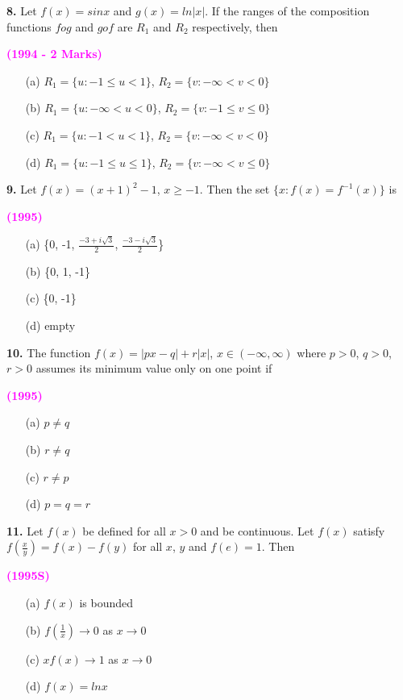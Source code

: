 \documentclass[journal,12pt,twocolumn]{IEEEtran}
\theoremstyle{remark}
\begin{document}
\textbf{8.} Let $f(x)=sinx$ and $g(x)=ln|x|$. If the ranges of the composition functions $fog$ and $gof$ are $R_1$ and $R_2$ respectively, then 

\hfill{\textcolor{magenta}{\textbf{(1994 - 2 Marks)}}}

\begin{enumerate}
\item[(a)] $R_1=\{u:-1\le u<1\}$, $R_2=\{v:-\infty<v<0\}$
\item[(b)] $R_1=\{u:-\infty<u<0\}$, $R_2=\{v:-1\le v\le0\}$
\item[(c)] $R_1=\{u:-1<u<1\}$, $R_2=\{v:-\infty<v<0\}$
\item[(d)] $R_1=\{u:-1\le u\le1\}$, $R_2=\{v:-\infty<v\le0\}$
\end{enumerate}

\textbf{9.} Let $f(x)=(x+1)^{2}-1$, $x\ge-1$. Then the set $\{x:f(x)=f^{-1}(x)\}$ is

\hfill{\textcolor{magenta}{\textbf{(1995)}}}

\begin{enumerate}
\item[(a)] \{0, -1, $\frac{-3+i\sqrt{3}}{2}$, $\frac{-3-i\sqrt{3}}{2}$\}
\item[(b)] \{0, 1, -1\}
\item[(c)] \{0, -1\}
\item[(d)] empty
\end{enumerate}

\textbf{10.} The function $f(x)=|px-q|+r|x|$, $x\in(-\infty,\infty)$ where $p>0$, $q>0$, $r>0$ assumes its minimum value only on one point if

\hfill{\textcolor{magenta}{\textbf{(1995)}}}

\begin{multicols}{2}
	\begin{enumerate}
		\item[(a)] $p\neq q$
		\item[(b)] $r\neq q$
		\item[(c)] $r\neq p$ 
		\item[(d)] $p=q=r$
	\end{enumerate}
\end{multicols}

\textbf{11.} Let $f(x)$ be defined for all $x>0$ and be continuous. Let $f(x)$ satisfy $f\left(\frac{x}{y}\right)=f(x)-f(y)$ for all $x$, $y$ and $f(e)=1$. Then

\hfill{\textcolor{magenta}{\textbf{(1995S)}}}

\begin{multicols}{2}
	\begin{enumerate}
		\item[(a)] $f(x)$ is bounded 
		\item[(b)] $f\left(\frac{1}{x}\right)\to0$ as $x\to0$
		\item[(c)] $xf(x)\to1$ as $x\to0$ 
		\item[(d)] $f(x)=lnx$
	\end{enumerate}
\end{multicols}
\end{document}
